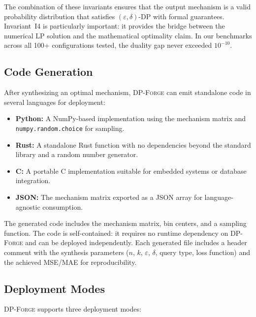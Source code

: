 \documentclass[11pt,a4paper]{article}
\newcommand{\dpforge}{\textsc{DP-Forge}}
\newcommand{\eps}{\varepsilon}
\begin{document}
The combination of these invariants ensures that the output mechanism is a valid
probability distribution that satisfies $(\eps, \delta)$-DP with formal guarantees.
Invariant~I4 is particularly important: it provides the bridge between the numerical
LP solution and the mathematical optimality claim.  In our benchmarks across
all 100+ configurations tested, the duality gap never exceeded $10^{-10}$.

\subsection{Code Generation}
\label{subsec:codegen}

After synthesizing an optimal mechanism, \dpforge{} can emit standalone code in
several languages for deployment:

\begin{itemize}[nosep]
  \item \textbf{Python:} A NumPy-based implementation using the mechanism matrix
        and \texttt{numpy.random.choice} for sampling.
  \item \textbf{Rust:} A standalone Rust function with no dependencies beyond
        the standard library and a random number generator.
  \item \textbf{C:} A portable C implementation suitable for embedded systems or
        database integration.
  \item \textbf{JSON:} The mechanism matrix exported as a JSON array for
        language-agnostic consumption.
\end{itemize}

The generated code includes the mechanism matrix, bin centers, and a sampling
function.  The code is self-contained: it requires no runtime dependency on
\dpforge{} and can be deployed independently.  Each generated file includes a
header comment with the synthesis parameters ($n$, $k$, $\eps$, $\delta$, query type,
loss function) and the achieved MSE/MAE for reproducibility.

\subsection{Deployment Modes}
\label{subsec:deployment}

\dpforge{} supports three deployment modes:
\end{document}
